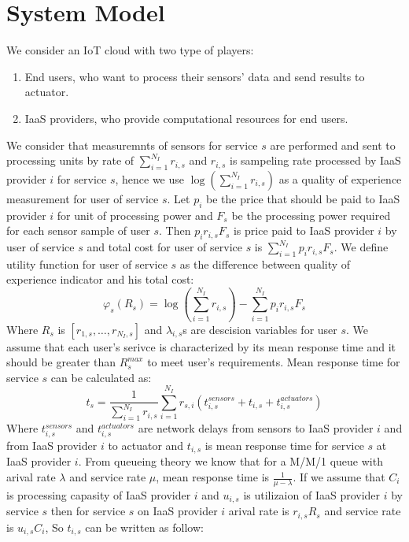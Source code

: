 \documentclass[conference]{IEEEtran}
\begin{document}
  \section{System Model}
    \cite{ref1}
    We consider an IoT cloud with two type of players:
    \begin{enumerate}
      \item End users, who want to process their sensors' data and send results to actuator.
      \item IaaS providers, who provide computational resources for end users.
    \end{enumerate}
    We consider that measuremnts of sensors for service $s$ are performed and sent to processing units by rate of $\sum_{i=1}^{N_I} r_{i,s}$ and $r_{i,s}$ is sampeling rate processed by IaaS provider $i$ for service $s$, hence we use $\log(\sum_{i=1}^{N_I} r_{i,s})$ as a quality of experience measurement for user of service $s$.
    Let $p_i$ be the price that should be paid to IaaS provider $i$ for unit of processing power and $F_s$ be the processing power required for each sensor sample of user $s$.
    Then $p_i r_{i,s} F_s$ is price paid to IaaS provider $i$ by user of service $s$ and total cost for user of service $s$ is $\sum_{i=1}^{N_I}{p_i r_{i,s} F_s}$.
    We define utility function for user of service $s$ as the difference between quality of experience indicator and his total cost:
    \begin{equation}
      \varphi_s(R_s)=\log(\sum_{i=1}^{N_I} r_{i,s}) - \sum_{i=1}^{N_I}{p_i r_{i,s} F_s}
    \end{equation}
    Where $R_s$ is $[r_{1,s}, \hdots, r_{N_I,s}]$ and $\lambda_{i,s}$s are descision variables for user $s$.
    We assume that each user's serivce is characterized by its mean response time and it should be greater than $R_s^{max}$ to meet user's requirements.
    Mean response time for service $s$ can be calculated as:
    \begin{equation}
      t_s = \frac{1}{\sum_{i=1}^{N_I} r_{i,s}}\sum_{i=1}^{N_I}{r_{s,i}(t^{sensors}_{i,s} + t_{i,s} + t^{actuators}_{i,s})}
    \end{equation}
    Where $t^{sensors}_{i,s}$ and $t^{actuators}_{i,s}$ are network delays from sensors to IaaS provider $i$ and from IaaS provider $i$ to actuator and $t_{i,s}$ is mean response time for service $s$ at IaaS provider $i$.
    From queueing theory we know that for a M/M/1 queue with arival rate $\lambda$ and service rate $\mu$, mean response time is $\frac{1}{\mu - \lambda}$.
    If we assume that $C_i$ is processing capasity of IaaS provider $i$ and $u_{i,s}$ is utilizaion of IaaS provider $i$ by service $s$ then for service $s$ on IaaS provider $i$ arival rate is $r_{i,s} R_s$ and service rate is $u_{i,s} C_i$, So $t_{i,s}$ can be written as follow:
\end{document}
